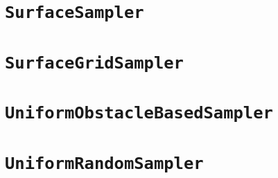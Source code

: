 \section{\texttt{SurfaceSampler}}

\section{\texttt{SurfaceGridSampler}}

\section{\texttt{UniformObstacleBasedSampler}}

\section{\texttt{UniformRandomSampler}}

